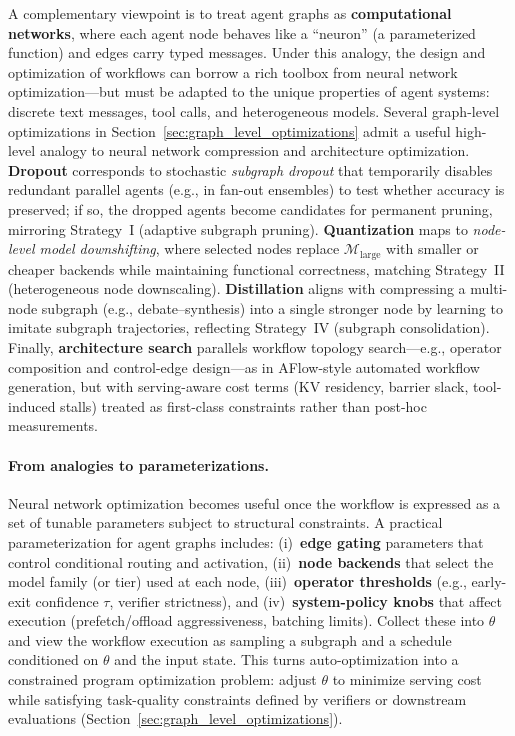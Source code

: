 A complementary viewpoint is to treat agent graphs as \textbf{computational networks}, where each agent node behaves like a ``neuron'' (a parameterized function) and edges carry typed messages. Under this analogy, the design and optimization of workflows can borrow a rich toolbox from neural network optimization---but must be adapted to the unique properties of agent systems: discrete text messages, tool calls, and heterogeneous models. Several graph-level optimizations in Section~\ref{sec:graph_level_optimizations} admit a useful high-level analogy to neural network compression and architecture optimization. \textbf{Dropout} corresponds to stochastic \emph{subgraph dropout} that temporarily disables redundant parallel agents (e.g., in fan-out ensembles) to test whether accuracy is preserved; if so, the dropped agents become candidates for permanent pruning, mirroring Strategy~I (adaptive subgraph pruning). \textbf{Quantization} maps to \emph{node-level model downshifting}, where selected nodes replace $\mathcal{M}_{\text{large}}$ with smaller or cheaper backends while maintaining functional correctness, matching Strategy~II (heterogeneous node downscaling). \textbf{Distillation} aligns with compressing a multi-node subgraph (e.g., debate--synthesis) into a single stronger node by learning to imitate subgraph trajectories, reflecting Strategy~IV (subgraph consolidation). Finally, \textbf{architecture search} parallels workflow topology search---e.g., operator composition and control-edge design---as in AFlow-style automated workflow generation, but with serving-aware cost terms (KV residency, barrier slack, tool-induced stalls) treated as first-class constraints rather than post-hoc measurements.

\paragraph{From analogies to parameterizations.}
Neural network optimization becomes useful once the workflow is expressed as a set of tunable parameters
subject to structural constraints.
A practical parameterization for agent graphs includes:
(i)~\textbf{edge gating} parameters that control conditional routing and activation,
(ii)~\textbf{node backends} that select the model family (or tier) used at each node,
(iii)~\textbf{operator thresholds} (e.g., early-exit confidence $\tau$, verifier strictness),
and (iv)~\textbf{system-policy knobs} that affect execution (prefetch/offload aggressiveness, batching limits).
Collect these into $\theta$ and view the workflow execution as sampling a subgraph and a schedule conditioned on
$\theta$ and the input state.
This turns auto-optimization into a constrained program optimization problem: adjust $\theta$ to minimize
serving cost while satisfying task-quality constraints defined by verifiers or downstream evaluations
(Section~\ref{sec:graph_level_optimizations}).

